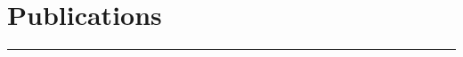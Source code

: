 \documentclass[letterpaper,10pt]{article}
\begin{document}

\section*{\sc Publications}
\hrule
\vspace{.1in}
\end{document}
